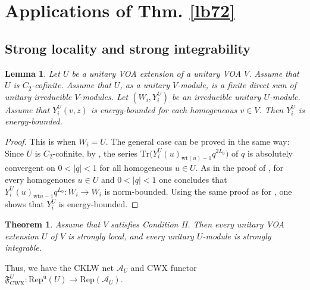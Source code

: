 \documentclass[11pt,b5paper,notitlepage]{article}
\theoremstyle{definition}
\theoremstyle{plain}
\newtheorem{thm}[df]{Theorem}
\newtheorem{lm}[df]{Lemma}
\newcommand{\fk}{\mathfrak}
\newcommand{\mc}{\mathcal}
\newcommand{\Tr}{\mathrm{Tr}}
\newcommand{\Rep}{\mathrm{Rep}}
\newcommand{\uni}{\mathrm{u}}
\newcommand{\RepU}{\mathrm{Rep}^\uni(U)}
\newcommand{\wt}{\mathrm{wt}}
\newcommand{\CWX}{{\scriptscriptstyle \mathrm{CWX}}}
\numberwithin{equation}{section}
\begin{document}
\section{Applications of Thm. \ref{lb72}}





\subsection{Strong locality and strong integrability}


\begin{lm}\label{lb77}
Let $U$ be a unitary VOA extension of a unitary VOA $V$. Assume that $U$ is $C_2$-cofinite. Assume that $U$, as a unitary $V$-module, is a finite direct sum of unitary irreducible $V$-modules. Let $(W_i,Y^U_i)$ be an irreducible unitary $U$-module. Assume that $Y_i^U(v,z)$ is energy-bounded for each homogeneous $v\in V$. Then $Y_i^U$ is energy-bounded.
\end{lm}

\begin{proof}
This is \cite[Thm. 4.6]{CT23} when $W_i=U$. The general case can be proved in the same way: Since $U$ is $C_2$-cofinite, by \cite{Zhu96}, the series $\Tr\big(Y^U_i(u)_{\wt(u)-1}q^{2L_0}\big)$ of $q$ is absolutely convergent on $0<|q|<1$ for all homogeneous $u\in U$. As in the proof of \cite[Prop. 3.17]{CT23}, for every homogenoues $u\in U$ and $0<|q|<1$ one concludes that $Y^U_i(u)_{\wt u-1}q^{L_0}:W_i\rightarrow W_i$ is norm-bounded. Using the same proof as for \cite[Thm. 4.5]{CT23}, one shows that $Y^U_i$ is energy-bounded.
\end{proof}








\begin{thm}\label{lb78}
Assume that $V$ satisfies Condition II. Then every unitary VOA extension $U$ of $V$ is strongly local, and every unitary $U$-module is strongly integrable. 
\end{thm}
Thus, we have the CKLW net $\mc A_U$ and CWX functor $\fk F_\CWX^U:\RepU\rightarrow\Rep(\mc A_U)$. 
\end{document}
